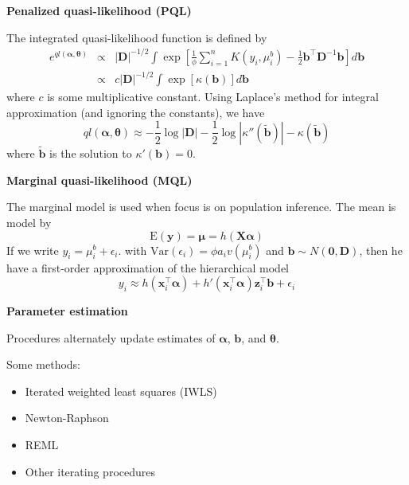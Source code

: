 \documentclass[mathserif, 11pt, t]{beamer}
\newcommand{\E}{\mathrm{E}}
\newcommand{\Var}{\mathrm{Var}}
\newcommand{\m}[1]{\mathbf{\bm{#1}}}
\renewcommand{\subtitle}[1]{\vspace{0.45cm}\textcolor{bluegreen}{
    {\textbf{#1}}}\vspace{0.15cm}\newline}
\begin{document}
\begin{frame}

\subtitle{Penalized quasi-likelihood (PQL)}

The integrated quasi-likelihood function is defined by
\begin{eqnarray*}
e^{ql(\m{\alpha}, \m{\theta})} &\propto& |\m{D}|^{-1/2}\int\exp\left[\frac{1}{\phi}\sum_{i=1}^nK(y_i,\mu_i^b)-\frac{1}{2}\m{b}^\top\m{D}^{-1}\m{b} \right]d\m{b} \\
&\propto& c|\m{D}|^{-1/2}\int\exp\left[ \kappa(\m{b}) \right] d\m{b} 
\end{eqnarray*}
where $c$ is some multiplicative constant. Using Laplace's method for integral approximation (and ignoring the constants), we have
\[ql(\m{\alpha}, \m{\theta}) \approx -\frac{1}{2}\log|\m{D}| -\frac{1}{2}\log|\kappa''(\tilde{\m{b}})| - \kappa(\tilde{\m{b}}) \]
where $\tilde{\m{b}}$ is the solution to $\kappa'(\m{b})=0$.

\end{frame}

\begin{frame}
\subtitle{Marginal quasi-likelihood (MQL)}

The marginal model is used when focus is on population inference. The mean is model by
\[ \E(\m{y}) = \m{\mu} = h(\m{X}\m{\alpha}) \]
If we write $y_i=\mu_i^b+\epsilon_i$. with $\Var(\epsilon_i)=\phi a_iv(\mu_i^b)$ and $\m{b}\sim N(\m{0}, \m{D})$, then he have a first-order approximation of the hierarchical model
\[ y_i \approx h(\m{x}_i^\top \m{\alpha}) + h'(\m{x}_i^\top\m{\alpha})\m{z}_i^\top\m{b} + \epsilon_i \]


\end{frame}



\begin{frame}
\subtitle{Parameter estimation}

Procedures alternately update estimates of $\m{\alpha}$, $\m{b}$, and $\m{\theta}$.
\bigskip

Some methods:
\begin{itemize}[label={$\cdot$}]
\item Iterated weighted least squares (IWLS)
\item Newton-Raphson
\item REML
\item Other iterating procedures
\end{itemize}

\end{frame}
\end{document}
